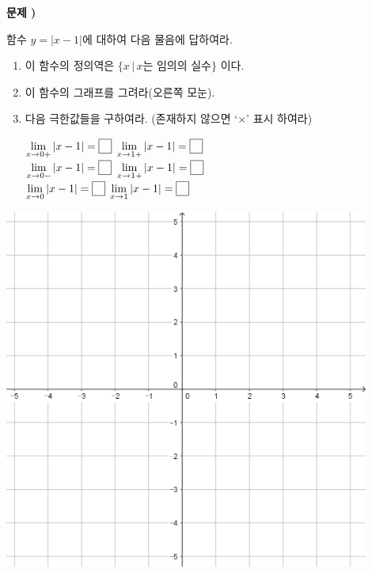 \documentclass[a4paper]{oblivoir}
\newcounter{num}
\newcommand\prob[1]
{\bigskip\par\noindent\stepcounter{num} \textbf{문제 \thenum) #1}\par\noindent}
\newcommand\pb[1]{\ensuremath{\fbox{\phantom{#1}}}}
\begin{document}
%
\prob{}
\begin{minipage}{0.45\textwidth}
함수 \(y=|x-1|\)에 대하여 다음 물음에 답하여라.
\begin{enumerate}[(1)]
\item
이 함수의 정의역은 \(\{x\,|\,x\text{는 임의의 실수}\}\) 이다.
\item
이 함수의 그래프를 그려라(오른쪽 모눈).
\item
다음 극한값들을 구하여라. (존재하지 않으면 `\(\times\)' 표시 하여라)
\par\bigskip
\(\displaystyle\lim_{x\to0+}|x-1|=\pb{3}\)\qquad
\(\displaystyle\lim_{x\to1+}|x-1|=\pb{3}\)
\\
\(\displaystyle\lim_{x\to0-}|x-1|=\pb{3}\)\qquad
\(\displaystyle\lim_{x\to1+}|x-1|=\pb{3}\)
\\
\(\displaystyle\lim_{x\to0}|x-1|=\pb{3}\)\qquad
\(\displaystyle\lim_{x\to1}|x-1|=\pb{3}\)
\end{enumerate}
\end{minipage}
\begin{minipage}{0.45\textwidth}
\par\bigskip\includegraphics[width=0.9\textwidth]{55}
\end{minipage}\bigskip\bigskip\par
\end{document}
